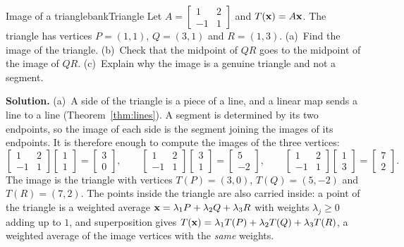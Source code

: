 \documentclass[11pt]{article}
\begin{document}
\begin{exmp}{Image of a triangle}{bankTriangle}
Let $A=\begin{bmatrix}1&2\\-1&1\end{bmatrix}$ and $T(\mathbf{x})=A\mathbf{x}$. The triangle has vertices $P=(1,1)$, $Q=(3,1)$ and $R=(1,3)$. (a)~Find the image of the triangle. (b)~Check that the midpoint of $QR$ goes to the midpoint of the image of $QR$. (c)~Explain why the image is a genuine triangle and not a segment.

\textbf{Solution.} (a)~A side of the triangle is a piece of a line, and a linear map sends a line to a line (Theorem~\ref{thm:lines}). A segment is determined by its two endpoints, so the image of each side is the segment joining the images of its endpoints. It is therefore enough to compute the images of the three vertices:
\[
\begin{bmatrix}1&2\\-1&1\end{bmatrix}\begin{bmatrix}1\\1\end{bmatrix}=\begin{bmatrix}3\\0\end{bmatrix},\qquad
\begin{bmatrix}1&2\\-1&1\end{bmatrix}\begin{bmatrix}3\\1\end{bmatrix}=\begin{bmatrix}5\\-2\end{bmatrix},\qquad
\begin{bmatrix}1&2\\-1&1\end{bmatrix}\begin{bmatrix}1\\3\end{bmatrix}=\begin{bmatrix}7\\2\end{bmatrix}.
\]
The image is the triangle with vertices $T(P)=(3,0)$, $T(Q)=(5,-2)$ and $T(R)=(7,2)$. The points inside the triangle are also carried inside: a point of the triangle is a weighted average $\mathbf{x}=\lambda_1P+\lambda_2Q+\lambda_3R$ with weights $\lambda_j\ge0$ adding up to $1$, and superposition gives $T(\mathbf{x})=\lambda_1T(P)+\lambda_2T(Q)+\lambda_3T(R)$, a weighted average of the image vertices with the \emph{same} weights.


\end{exmp}
\end{document}
